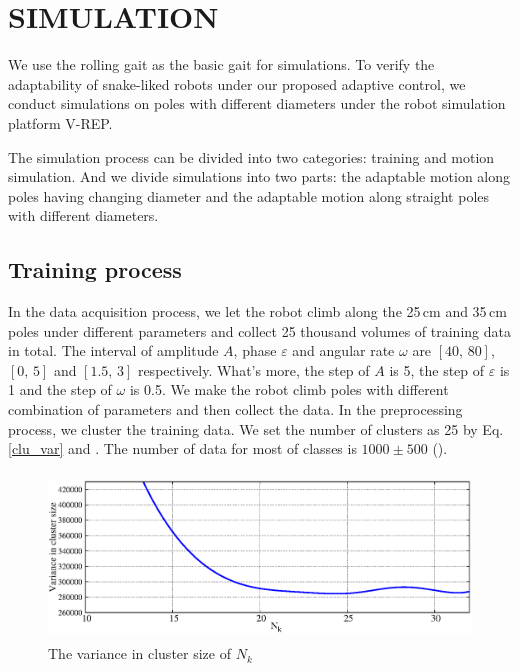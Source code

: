 \section{SIMULATION}
We use the rolling gait as the basic gait for simulations. To verify the adaptability of snake-liked robots under our proposed adaptive control, we conduct simulations on poles with different diameters under the robot simulation platform V-REP.

The simulation process can be divided into two categories: training and motion simulation. And we divide simulations into two parts: the adaptable motion along poles having changing diameter and the adaptable motion along straight poles with different diameters.

\subsection{Training process}

In the data acquisition process, we let the robot climb along the 25\,cm and 35\,cm poles under different parameters and collect 25 thousand volumes of training data in total. The interval of amplitude $A$, phase $\varepsilon$ and angular rate $\omega$ are $[40, \, 80]$, $[0, \, 5]$ and $[1.5, \, 3]$ respectively. What's more, the step of $A$ is 5, the step of $\varepsilon$ is 1 and the step of $\omega$ is 0.5. We make the robot climb poles with different combination of parameters and then collect the data. In the preprocessing process, we cluster the training data. We set the number of clusters as 25 by Eq.\ref{clu_var} and . The number of data for most of classes is $1000 \pm 500 $ ().

\begin{figure}[!h]
	\centering
	\includegraphics[width=1.0\linewidth,height=125pt]{fig/experiment/170912/clusize}
	\caption{The variance in cluster size of $N_{k}$}
\end{figure}

